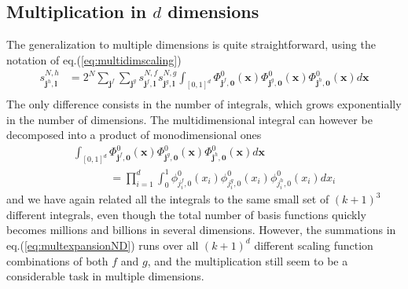 \subsection*{Multiplication in $d$ dimensions}
The generalization to multiple dimensions is quite straightforward, using the
notation of eq.(\ref{eq:multidimscaling})
\begin{align}
	\nonumber
	s^{N,h}_{\boldsymbol{j}^h,\boldsymbol{l}}
	&= 2^N \sum_{\boldsymbol{j}^f}\sum_{\boldsymbol{j}^g} 
		s_{\boldsymbol{j}^f,\boldsymbol{l}}^{N,f} 
		s_{\boldsymbol{j}^g,\boldsymbol{l}}^{N,g} \int_{[0,1]^d}
		\Phi_{\boldsymbol{j}^f,\boldsymbol{0}}^0(\boldsymbol{x})
		\Phi_{\boldsymbol{j}^g,\boldsymbol{0}}^0(\boldsymbol{x})
		\Phi_{\boldsymbol{j}^h,\boldsymbol{0}}^0(\boldsymbol{x})
		d\boldsymbol{x}\\
	\label{eq:multexpansionND}
\end{align}
The only difference consists in the number of integrals, which grows
exponentially in the number of dimensions. The multidimensional integral can
however be decomposed into a product of monodimensional ones
\begin{align}
	\nonumber
	\int_{[0,1]^d} 
	\Phi_{\boldsymbol{j}^f,\boldsymbol{0}}^0(\boldsymbol{x})
	\Phi_{\boldsymbol{j}^g,\boldsymbol{0}}^0(\boldsymbol{x})
	\Phi_{\boldsymbol{j}^h,\boldsymbol{0}}^0(\boldsymbol{x})
	d\boldsymbol{x}\ \ \ \ \ \ \ \ \ \ \ \ \ \ \ \ \ \ \ \ \ \ \ \ \ \ \\
	\ \ \ \ \ \ \ \ \ \ \ \ \ \ \ 
	= 	\prod_{i=1}^d \int_0^1
		\phi_{j_i^f,0}^0(x_i)\phi_{j_i^g,0}^0(x_i)\phi_{j_i^h,0}^0(x_i)dx_i
\end{align}
and we have again related all the integrals to the same small set of 
$(k+1)^3$ different integrals, even though the total number of basis functions
quickly becomes millions and billions in several dimensions. However, the 
summations in eq.(\ref{eq:multexpansionND})
runs over all $(k+1)^d$ different scaling function combinations of both $f$
and $g$, and the multiplication still seem to be a considerable task in 
multiple dimensions.

